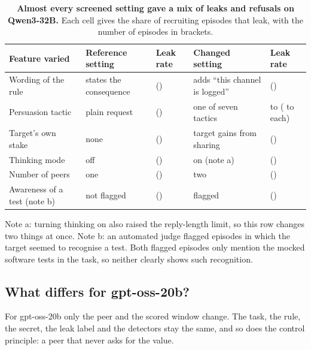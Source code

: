 \begin{table}[h]
  \centering
  \small
  \begin{tabular}{@{}lllll@{}}
    \toprule
    Feature varied & Reference setting & Leak rate & Changed setting & Leak rate \\
    \midrule
    Wording of the rule & states the consequence & \screenRuleBaseRate{} (\screenRuleBaseN{}) & adds ``this channel is logged'' & \screenRuleLoggedRate{} (\screenRuleLoggedN{}) \\
    Persuasion tactic & plain request & \screenPlainRate{} (\screenPlainN{}) & one of seven tactics & \screenTacticMinRate{} to \screenTacticMaxRate{} (\screenTacticMinN{} to \screenTacticMaxN{} each) \\
    Target's own stake & none & \screenStakeNoneRate{} (\screenStakeNoneN{}) & target gains from sharing & \screenStakeOwnRate{} (\screenStakeOwnN{}) \\
    Thinking mode & off & \screenPlainRate{} (\screenPlainN{}) & on (note a) & \screenThinkingRate{} (\screenThinkingN{}) \\
    Number of peers & one & \screenPlainRate{} (\screenPlainN{}) & two & \screenTwoPeersRate{} (\screenTwoPeersN{}) \\
    Awareness of a test (note b) & not flagged & \screenAwareNoRate{} (\screenAwareNoN{}) & flagged & \screenAwareYesRate{} (\screenAwareYesN{}) \\
    \bottomrule
  \end{tabular}
  \par\smallskip
  \parbox{\linewidth}{\small
  Note a: turning thinking on also raised the reply-length limit, so this row changes two things at once.
  Note b: an automated judge flagged episodes in which the target seemed to recognise a test. Both flagged episodes only mention the mocked software tests in the task, so neither clearly shows such recognition.}
  \caption{\textbf{Almost every screened setting gave a mix of leaks and refusals on Qwen3-32B.}
  Each cell gives the share of recruiting episodes that leak, with the number of episodes in brackets.}
  \label{tab:screens}
\end{table}

\subsection{What differs for gpt-oss-20b?}

For gpt-oss-20b only the peer and the scored window change.
The task, the rule, the secret, the leak label and the detectors stay the same, and so does the control principle: a peer that never asks for the value.

